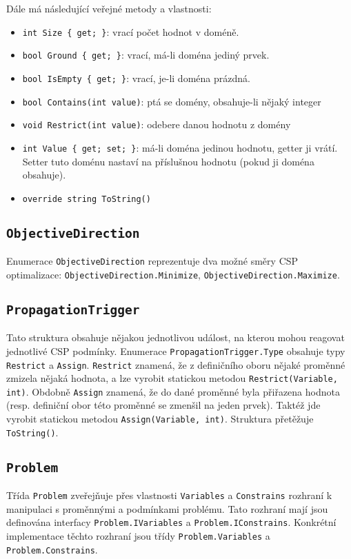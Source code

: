 \documentclass[a4paper]{article}
\begin{document}
Dále má následující veřejné metody a vlastnosti:
\begin{itemize}
\item
	\texttt{int Size \{ get; \}}: vrací počet hodnot v doméně.
\item	\texttt{bool Ground \{ get; \}}: vrací, má-li doména jediný prvek.
\item	\texttt{bool IsEmpty \{ get; \}}: vrací, je-li doména prázdná.
\item	\texttt{bool Contains(int value)}: ptá se domény, obsahuje-li nějaký
	integer
\item	\texttt{void Restrict(int value)}: odebere danou hodnotu z domény
\item	\texttt{int Value \{ get; set; \}}: má-li doména jedinou hodnotu,
	getter ji vrátí. Setter tuto doménu nastaví na příslušnou hodnotu (pokud
	ji doména obsahuje).
\item	\texttt{override string ToString()}
\end{itemize}

\subsection{\texttt{ObjectiveDirection}}
Enumerace \texttt{ObjectiveDirection} reprezentuje dva možné směry CSP
optimalizace: \texttt{ObjectiveDirection.Minimize},
\texttt{ObjectiveDirection.Maximize}.

\subsection{\texttt{PropagationTrigger}}
Tato struktura obsahuje nějakou jednotlivou událost, na kterou mohou reagovat
jednotlivé CSP podmínky. Enumerace \texttt{PropagationTrigger.Type} obsahuje
typy \texttt{Restrict} a \texttt{Assign}. \texttt{Restrict} znamená, že
z definičního oboru nějaké proměnné zmizela nějaká hodnota, a lze vyrobit
statickou metodou \texttt{Restrict(Variable, int)}. Obdobně \texttt{Assign}
znamená, že do dané proměnné byla přiřazena hodnota (resp. definiční obor této
proměnné se zmenšil na jeden prvek). Taktéž jde vyrobit statickou metodou
\texttt{Assign(Variable, int)}. Struktura přetěžuje \texttt{ToString()}.

\subsection{\texttt{Problem}}
Třída \texttt{Problem} zveřejňuje přes vlastnosti \texttt{Variables} a
\texttt{Constrains} rozhraní k manipulaci s proměnnými a
podmínkami problému. Tato rozhraní mají jsou definována interfacy
\texttt{Problem.IVariables} a \texttt{Problem.IConstrains}. Konkrétní
implementace těchto rozhraní jsou třídy \texttt{Problem.Variables} a
\texttt{Problem.Constrains}.
\end{document}
